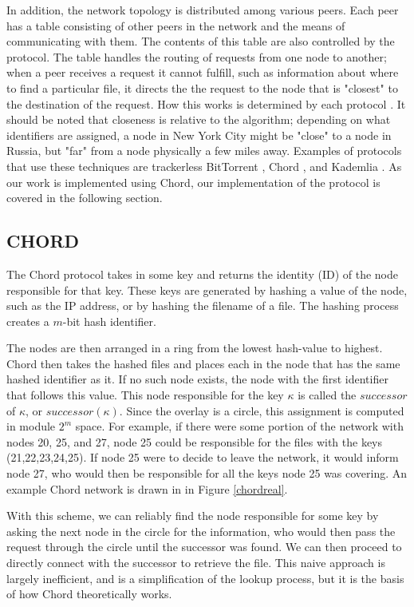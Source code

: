 \documentclass[conference, compsocconf, letterpaper]{IEEEtran}
\begin{document}
In addition, the network topology is distributed among various peers.  Each peer has a table consisting of other peers in the network and the means of communicating with them.  The contents of this table are also controlled by the protocol.  The table handles the routing of requests from one node to another; when a peer receives a request it cannot fulfill, such as information about where to find a particular file, it directs the the request to the node that is "closest" to the destination of the request. How this works is determined by each protocol \cite{Chord}.  It should be noted that closeness is relative to the algorithm; depending on what identifiers are assigned, a node in New York City might be "close" to a node in Russia, but "far" from a node physically a few miles away.  Examples of protocols that use these techniques are trackerless BitTorrent \cite{BitTorrent}, Chord \cite{Chord}, and Kademlia \cite{Kademlia}.  As our work is implemented using Chord, our implementation of the protocol is covered in the following section. 






\subsection{CHORD}
The Chord protocol \cite{Chord} takes in some key and returns the identity (ID) of the node responsible for that key.  These keys are generated by hashing a value of the node, such as the IP address, or by hashing  the filename of a file.  The hashing process creates a $m$-bit hash identifier.

The nodes are then arranged in a ring from the lowest hash-value to highest.  Chord then takes the hashed files and places each in the node that has the same hashed identifier as it.  If no such node exists, the node with the first identifier that follows this value.  This node responsible for the key $\kappa$ is called the $successor$ of $\kappa$, or $successor(\kappa)$.  Since the overlay is a circle, this assignment is computed in module $2^m$ space.  For example, if there were some portion of the network with nodes 20, 25, and 27, node 25 could be responsible for the files with the keys (21,22,23,24,25). If node 25 were to decide to leave the network, it would inform node 27, who would then be responsible for all the keys node 25 was covering. An example Chord network is drawn in in Figure \ref{chordreal}.

With this scheme, we can reliably find the node responsible for some key by asking the next node in the circle for the information, who would then pass the request through the circle until the successor was found.  We can then proceed to directly connect with the successor to retrieve the file.  This naive approach is largely inefficient, and is a simplification of the lookup process, but it is the basis of how Chord theoretically works.
\end{document}
